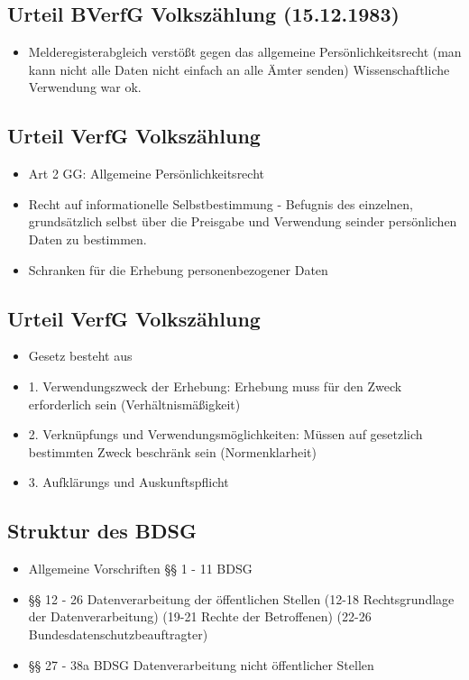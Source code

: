 \documentclass[a4paper,10pt]{scrartcl}
\begin{document}
\subsection{Urteil BVerfG Volkszählung (15.12.1983)}
\begin{itemize}
 \item Melderegisterabgleich verstößt gegen das allgemeine Persönlichkeitsrecht (man kann nicht
 alle Daten nicht einfach an alle Ämter senden) Wissenschaftliche Verwendung war ok.
\end{itemize}

\subsection{Urteil VerfG Volkszählung}
\begin{itemize}
 \item Art 2 GG: Allgemeine Persönlichkeitsrecht
 \item Recht auf informationelle Selbstbestimmung - Befugnis des einzelnen, grundsätzlich
 selbst über die Preisgabe und Verwendung seinder persönlichen Daten zu bestimmen.
 \item Schranken für die Erhebung personenbezogener Daten
\end{itemize}

\subsection{Urteil VerfG Volkszählung}
\begin{itemize}
 \item Gesetz besteht aus 
 \item 1. Verwendungszweck der Erhebung: Erhebung muss für den Zweck erforderlich sein (Verhältnismäßigkeit)
 \item 2. Verknüpfungs  und Verwendungsmöglichkeiten: Müssen auf gesetzlich bestimmten Zweck beschränk sein (Normenklarheit)
 \item 3. Aufklärungs und Auskunftspflicht
\end{itemize}

\subsection{Struktur des BDSG}
\begin{itemize}
 \item Allgemeine Vorschriften §§ 1 - 11 BDSG
 \item §§ 12 - 26 Datenverarbeitung der öffentlichen Stellen
 (12-18 Rechtsgrundlage der Datenverarbeitung) (19-21 Rechte der Betroffenen) (22-26 Bundesdatenschutzbeauftragter) 
 \item §§ 27 - 38a BDSG Datenverarbeitung nicht öffentlicher Stellen
\end{itemize}
\end{document}
